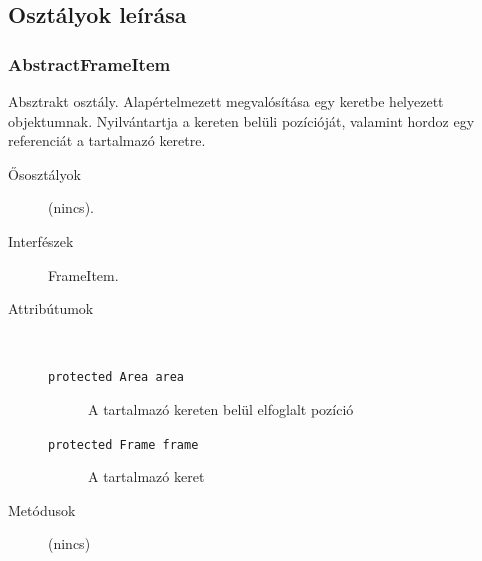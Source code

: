 	\subsection{Osztályok leírása}
	
		\subsubsection{AbstractFrameItem} Absztrakt osztály.
				 Alapértelmezett megvalósítása egy keretbe helyezett objektumnak.   Nyilvántartja a kereten belüli pozícióját, valamint hordoz  egy referenciát a tartalmazó keretre. 			\begin{description}


				\item[Ősosztályok] (nincs).
				\item[Interfészek] FrameItem.
				\item[Attribútumok]$\ $
					\begin{description}
						\item[\texttt{protected Area area}] A tartalmazó kereten belül elfoglalt pozíció 
						\item[\texttt{protected Frame frame}] A tartalmazó keret 
					\end{description}
				\item[Metódusok] (nincs)
			\end{description}

